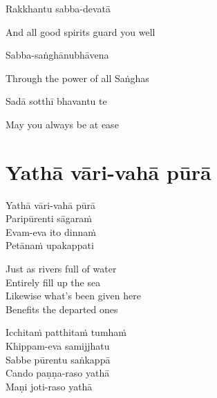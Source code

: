Rakkhantu sabba-devatā

\begin{english}
  And all good spirits guard you well
\end{english}

Sabba-saṅghānubhāvena

\begin{english}
  Through the power of all Saṅghas
\end{english}

Sadā sotthī bhavantu te

\begin{english}
  May you always be at ease
\end{english}



\setsecheadstyle{\subsectionFmt}
\section{Yathā vāri-vahā pūrā}
\label{yatha-vari-vaha-pura}

\vspace{-0.6em}

\begin{pali-hang}
  Yathā vāri-vahā pūrā\\
  Paripūrenti sāgaraṁ\\
  Evam-eva ito dinnaṁ\\
  Petānaṁ upakappati
\end{pali-hang}

\begin{english-verses}
  Just as rivers full of water\\
  Entirely fill up the sea\\
  Likewise what's been given here\\
  Benefits the departed ones\hyperlink{endnote1-appendix}{\hypertarget{endnote1-body}{}}
\end{english-verses}

\suttaRef{[Khp 1.7]}

\begin{pali-hang-continued}
  Icchitaṁ patthitaṁ tumhaṁ\\
  Khippam-eva samijjhatu\\
  Sabbe pūrentu saṅkappā\\
  Cando paṇṇa-raso yathā\\
  Maṇi joti-raso yathā\hyperlink{endnote1-appendix}{\hypertarget{endnote1-body}{}}
\end{pali-hang-continued}

